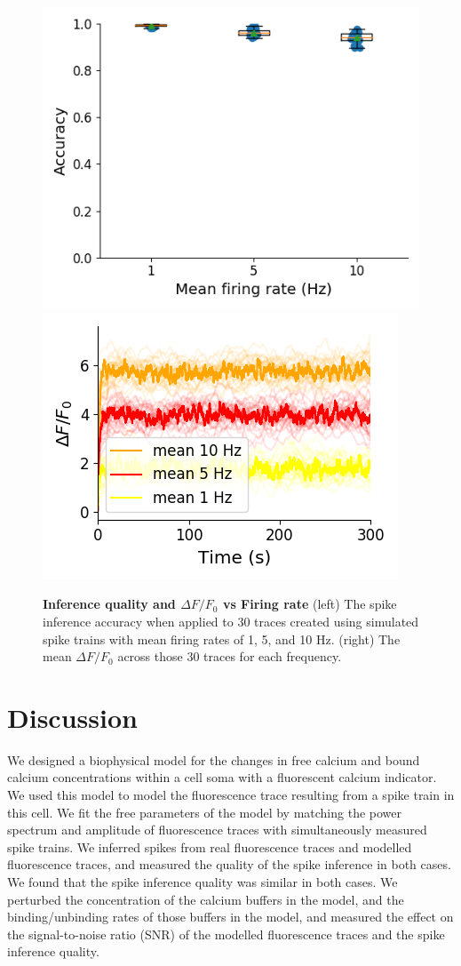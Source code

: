 \begin{figure}[h]
  \centering
  \includegraphics[width=0.45\linewidth]{figures/calcium_chapter/simulated_oasis_accuracy_paper.png}
  \includegraphics[width=0.45\linewidth]{figures/calcium_chapter/mean_fluorescence_comparison.png}
  \caption{\textbf{Inference quality and $\Delta F/F_0$ vs Firing rate} (left) The spike inference accuracy when applied to 30 traces created using simulated spike trains with mean firing rates of 1, 5, and 10 Hz. (right) The mean $\Delta F/F_0$ across those 30 traces for each frequency.}
  \label{fig:frequency_comparison_measures}
\end{figure}

\section{Discussion}
We designed a biophysical model for the changes in free calcium and bound calcium concentrations within a cell soma with a fluorescent calcium indicator. We used this model to model the fluorescence trace resulting from a spike train in this cell.  We fit the free parameters of the model by matching the power spectrum and amplitude of fluorescence traces with simultaneously measured spike trains. We inferred spikes from real fluorescence traces and modelled fluorescence traces, and measured the quality of the spike inference in both cases. We found that the spike inference quality was similar in both cases. We perturbed the concentration of the calcium buffers in the model, and the binding/unbinding rates of those buffers in the model, and measured the effect on the signal-to-noise ratio (SNR) of the modelled fluorescence traces and the spike inference quality.

